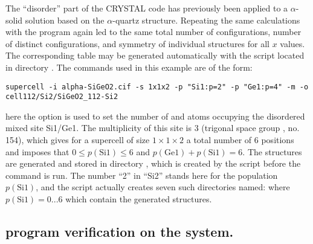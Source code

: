 \documentclass[a4paper,10pt]{article}
\begin{document}
The ``disorder'' part of the CRYSTAL code has previously been applied to a $\alpha$- solid solution based on the $\alpha$-quartz structure\cite{El-Kelany2014}. Repeating the same calculations with the \sups{} program again led to the same total number of configurations, number of distinct configurations, and symmetry of individual structures for all $x$ values. The corresponding table may be generated automatically with the script  located in directory . The \sups{} commands used in this example are of the form:
\begin{Verbatim}[breaklines]
  supercell -i alpha-SiGeO2.cif -s 1x1x2 -p "Si1:p=2" -p "Ge1:p=4" -m -o cell112/Si2/SiGeO2_112-Si2
\end{Verbatim}
here the  option is used to set the number of  and  atoms occupying the disordered mixed site Si1/Ge1. The multiplicity of this site is 3 (trigonal space group , no. 154), which gives for a supercell of size $1\times1\times2$ a total number of 6 positions and imposes that $0 \leq p(\text{Si1})\leq 6$ and $p(\text{Ge1})+p(\text{Si1})=6$. The structures are generated and stored in directory , which is created by the script before the command is run. The number ``2'' in ``Si2'' stands here for the population $p(\text{Si1})$, and the script actually creates seven such directories named:  where $p(\text{Si1})=0...6$ which contain the generated structures.

\subsection*{\Sups{} program verification on the  system.}
\end{document}
